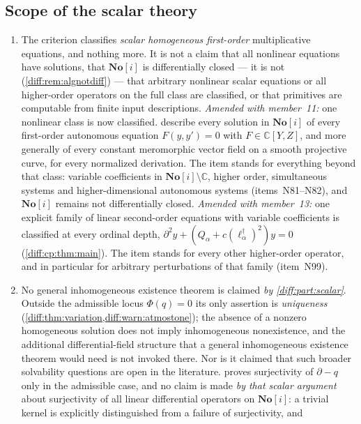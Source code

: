 \documentclass[11pt,letterpaper]{article}
\numberwithin{equation}{section}
\theoremstyle{definition}
\theoremstyle{remark}
\newcommand{\SC}{\mathbf{No}[i]}
\newcommand{\C}{\mathbb C}
\newcommand{\der}{\partial}
\begin{document}
\subsection{Scope of the scalar theory}
\label{diff:sub:nc:scalarscope}

\begin{enumerate}[label=\textup{N\arabic*.},leftmargin=3.0em,itemsep=0.35em,start=21]
\item The criterion classifies \emph{scalar homogeneous first-order}
multiplicative equations, and nothing more. It is not a claim that all
nonlinear equations have solutions, that $\SC$ is differentially closed --- it
is not (\cref{diff:rem:algnotdiff}) --- that arbitrary nonlinear scalar
equations or all higher-order operators on the full class are classified, or
that primitives are computable from finite input descriptions. \emph{Amended
with member~11:} one nonlinear class is now classified.
 describe every solution in
$\SC$ of every first-order autonomous equation $F(y,y')=0$ with $F\in\C[Y,Z]$,
and more generally of every constant meromorphic vector field on a smooth
projective curve, for every normalized derivation. The item stands for
everything beyond that class: variable coefficients in $\SC\setminus\C$, higher
order, simultaneous systems and higher-dimensional autonomous systems
(items~N81--N82), and $\SC$ remains not differentially closed.
\emph{Amended with member~13:} one explicit family of linear second-order
equations with variable coefficients is classified at every ordinal depth,
$\der^{2}y+(Q_{\alpha}+c(\ell_{\alpha}^{\dagger})^{2})y=0$
(\cref{diff:cp:thm:main}). The item stands for every other higher-order
operator, and in particular for arbitrary perturbations of that family
(item~N99).
\item No general inhomogeneous existence theorem is claimed \emph{by
\cref{diff:part:scalar}}. Outside the admissible locus $\Phi(q)=0$ its only
assertion is \emph{uniqueness}
(\cref{diff:thm:variation,diff:warn:atmostone}); the absence of a nonzero
homogeneous solution does not imply inhomogeneous nonexistence, and the
additional differential-field structure that a general inhomogeneous existence
theorem would need is not invoked there. Nor is it claimed that such broader
solvability questions are open in the literature. 
proves surjectivity of $\der-q$ only in the admissible case, and no claim is
made \emph{by that scalar argument} about surjectivity of all linear
differential operators on $\SC$: a
trivial kernel is explicitly distinguished from a failure of surjectivity, and

\end{enumerate}
\end{document}
